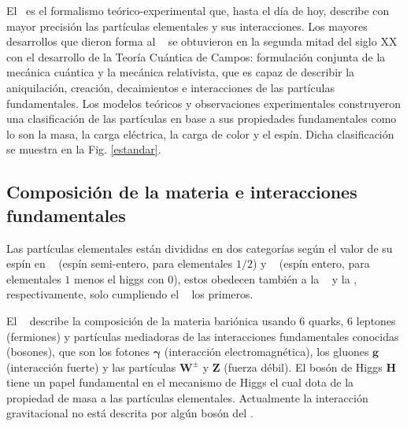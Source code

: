 El \ME~es el formalismo teórico-experimental que, hasta el día de hoy, describe con mayor precisión las partículas elementales y sus interacciones. Los mayores desarrollos que dieron forma al \ME~ se obtuvieron en la segunda mitad del siglo XX con el desarrollo de la Teoría Cuántica de Campos: formulación conjunta de la mecánica cuántica y la mecánica relativista, que es capaz de describir la aniquilación, creación, decaimientos e interacciones de las partículas fundamentales. Los modelos teóricos y observaciones experimentales construyeron una clasificación de las partículas en base a sus propiedades fundamentales como lo son la masa, la carga eléctrica, la carga de color y el espín. Dicha clasificación se muestra en la Fig. \ref{estandar}. 


\subsection{Composición de la materia e interacciones fundamentales} 

Las partículas elementales están divididas en dos categorías según el valor de su espín en \fermiones ~ (espín semi-entero, para elementales $1/2$) y \bosones ~ (espín entero, para elementales $1$ menos el higgs con $0$), estos obedecen también a la \fermidirac ~ y la \boseeinstein, respectivamente, solo cumpliendo el \pauli ~ los primeros.

El \ME ~ describe la composición de la materia bariónica usando 6 quarks, 6 leptones (fermiones) y partículas mediadoras de las interacciones fundamentales conocidas (bosones), que son los fotones $\mathbf{\gamma}$ (interacción electromagnética), los gluones $\mathbf{g}$ (interacción fuerte) y las partículas $\mathbf{W}^\pm$ y $\mathbf{Z}$ (fuerza débil). 
El bosón de Higgs $\mathbf{H}$ tiene un papel fundamental en el mecanismo de Higgs el cual dota de la propiedad de masa a las partículas elementales. Actualmente la interacción gravitacional no está descrita por algún bosón del \ME.


